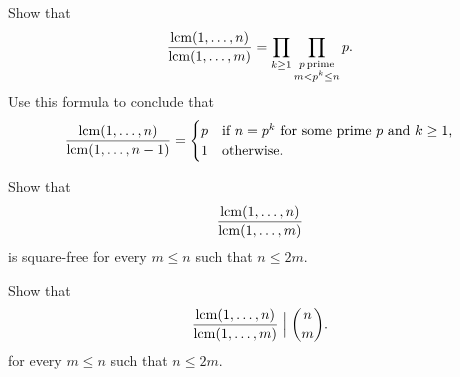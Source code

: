\begin{routine}
  \exercise \label{exercise:fractions-lcm}
  \begin{subexenum}
  \item Show that
    \begin{equation*}
      \frac{\operatorname*{lcm}(1,\ldots,n)}{\operatorname*{lcm}(1,\ldots,m)} =
      \prod_{k\geq 1} \prod_{\substack{p\,\text{prime}\\m<p^k\leq n}}p.
    \end{equation*}
    Use this formula to conclude that
    \begin{equation*}
      \frac{\operatorname*{lcm}(1,\ldots,n)}{\operatorname*{lcm}(1,\ldots,n-1)} =
      \begin{cases}
        p & \text{if $n=p^k$ for some prime $p$ and $k\geq 1$,} \\
        1 & \text{otherwise.}
      \end{cases}
    \end{equation*}
  \item Show that
    \begin{equation*}
      \frac{\operatorname*{lcm}(1,\ldots,n)}{\operatorname*{lcm}(1,\ldots,m)}
    \end{equation*}
    is square-free for every $m\leq n$ such that $n\leq 2m$.
  \item Show that
    \begin{equation*}
      \frac{\operatorname*{lcm}(1,\ldots,n)}{\operatorname*{lcm}(1,\ldots,m)}\mathrel{\Big|}\binom{n}{m}.
    \end{equation*}
    for every $m\leq n$ such that $n\leq 2m$.
  \end{subexenum}
\end{routine}

